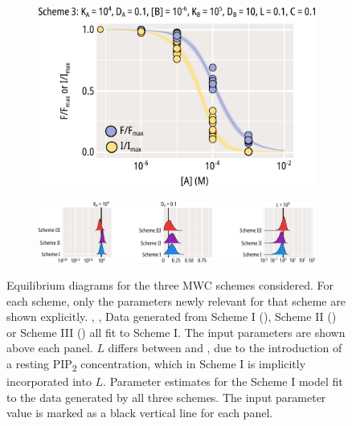 \begin{figure}[h]
\begin{subfigure}[t]{0.3\textwidth}
	\end{subfigure}
	\hfill
	\begin{subfigure}[t]{0.3\textwidth}
		\caption{}\label{ch4fig:mwc_scheme_3_fits}
		\centering
		\includegraphics[width=\textwidth]{mwc_scheme_3_fits.pdf}
	\end{subfigure}
	\vfill
	\begin{subfigure}[t]{0.9\textwidth}
		\caption{}\label{ch4fig:mwc_params_1}
		\centering
		\includegraphics[width=\textwidth]{mwc_scheme_param_fits.pdf}
	\end{subfigure}
	\caption[Generating data from MWC model schemes]{
	 Equilibrium diagrams for the three MWC schemes considered.
	For each scheme, only the parameters newly relevant for that scheme are shown explicitly.
	, ,  Data generated from Scheme I (), Scheme II () or Scheme III () all fit to Scheme I.
	The input parameters are shown above each panel.
	$L$ differs between  and ,  due to the introduction of a resting PIP\textsubscript{2} concentration, which in Scheme I is implicitly incorporated into $L$.
	 Parameter estimates for the Scheme I model fit to the data generated by all three schemes.
	The input parameter value is marked as a black vertical line for each panel.
	}\label{ch4fig:mwc_models}
\end{figure}

